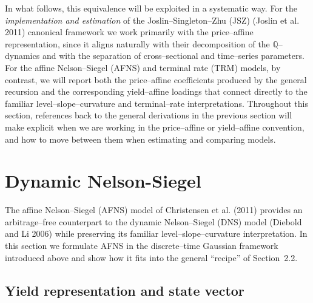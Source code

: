 \documentclass[
  letterpaper,
  DIV=11,
  numbers=noendperiod]{scrreprt}
\begin{document}
In what follows, this equivalence will be exploited in a systematic way.
For the \emph{implementation and estimation} of the
Joslin--Singleton--Zhu (JSZ) (Joslin et al. 2011) canonical framework we
work primarily with the price--affine representation, since it aligns
naturally with their decomposition of the \(\mathbb{Q}\)--dynamics and
with the separation of cross--sectional and time--series parameters. For
the affine Nelson--Siegel (AFNS) and terminal rate (TRM) models, by
contrast, we will report both the price--affine coefficients produced by
the general recursion and the corresponding yield--affine loadings that
connect directly to the familiar level--slope--curvature and
terminal--rate interpretations. Throughout this section, references back
to the general derivations in the previous section will make explicit
when we are working in the price--affine or yield--affine convention,
and how to move between them when estimating and comparing models.

\section{Dynamic Nelson-Siegel}\label{dynamic-nelson-siegel}

The affine Nelson--Siegel (AFNS) model of Christensen et al. (2011)
provides an arbitrage--free counterpart to the dynamic Nelson--Siegel
(DNS) model (Diebold and Li 2006) while preserving its familiar
level--slope--curvature interpretation. In this section we formulate
AFNS in the discrete--time Gaussian framework introduced above and show
how it fits into the general ``recipe'' of Section~2.2.

\subsection*{Yield representation and state
vector}\label{yield-representation-and-state-vector}
\end{document}
